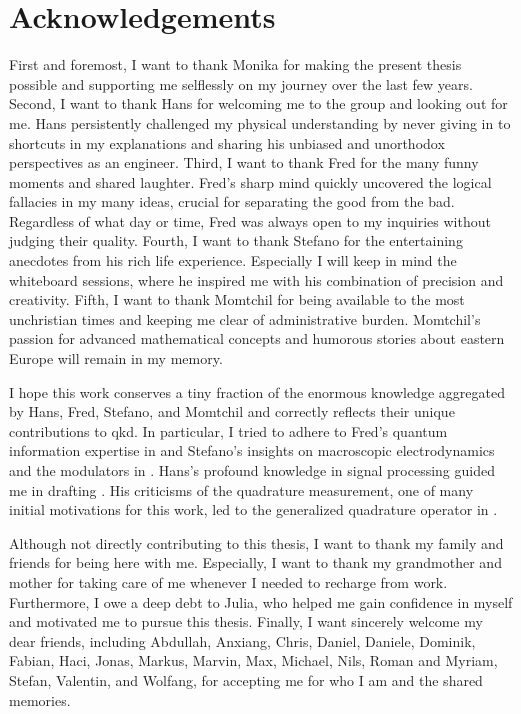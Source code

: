 
\chapter*{Acknowledgements}

First and foremost, I want to thank Monika for making the present thesis possible and supporting me selflessly on my journey over the last few years.
Second, I want to thank Hans for welcoming me to the group and looking out for me.
Hans persistently challenged my physical understanding by never giving in to shortcuts in my explanations and sharing his unbiased and unorthodox perspectives as an engineer.
Third, I want to thank Fred for the many funny moments and shared laughter.
Fred's sharp mind quickly uncovered the logical fallacies in my many ideas, crucial for separating the good from the bad.
Regardless of what day or time, Fred was always open to my inquiries without judging their quality.
Fourth, I want to thank Stefano for the entertaining anecdotes from his rich life experience.
Especially I will keep in mind the whiteboard sessions, where he inspired me with his combination of precision and creativity.
Fifth, I want to thank Momtchil for being available to the most unchristian times and keeping me clear of administrative burden.
Momtchil's passion for advanced mathematical concepts and humorous stories about eastern Europe will remain in my memory.

I hope this work conserves a tiny fraction of the enormous knowledge aggregated by Hans, Fred, Stefano, and Momtchil and correctly reflects their unique contributions to \gls{qkd}.
In particular, I tried to adhere to Fred's quantum information expertise in  and Stefano's insights on macroscopic electrodynamics and the modulators in .
Hans's profound knowledge in signal processing guided me in drafting .
His criticisms of the quadrature measurement, one of many initial motivations for this work, led to the generalized quadrature operator in .

Although not directly contributing to this thesis, I want to thank my family and friends for being here with me.
Especially, I want to thank my grandmother and mother for taking care of me whenever I needed to recharge from work.
Furthermore, I owe a deep debt to Julia, who helped me gain confidence in myself and motivated me to pursue this thesis.
Finally, I want sincerely welcome my dear friends, including Abdullah, Anxiang, Chris, Daniel, Daniele, Dominik, Fabian, Haci, Jonas, Markus, Marvin, Max, Michael, Nils, Roman and Myriam, Stefan, Valentin, and Wolfang, for accepting me for who I am and the shared memories.
